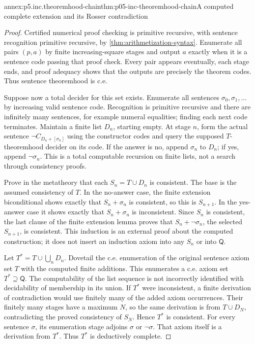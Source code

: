 \begin{annexitem}{annex:p5.inc.theoremhood-chain}{thm:p05-inc-theoremhood-chain}{A computed complete extension and its Rosser contradiction}
\begin{proof}
Certified numerical proof checking is primitive recursive, with
sentence recognition primitive recursive, by
\cref{thm:arithmetization-syntax}. Enumerate all pairs \((p,a)\)
by finite increasing-square stages and output \(a\) exactly when
it is a sentence code passing that proof check. Every pair appears
eventually, each stage ends, and proof adequacy shows that the outputs
are precisely the theorem codes. Thus sentence theoremhood is c.e.

Suppose now a total decider for this set exists. Enumerate all
sentences \(\sigma_0,\sigma_1,\ldots\) by increasing valid sentence
code. Recognition is primitive recursive and there are infinitely
many sentences, for example numeral equalities; finding each next
code terminates. Maintain a finite list \(D_n\), starting empty.
At stage \(n\), form the actual sentence
\(\neg C_{D_n\mathbin{+}[\sigma_n]}\) using the constructor
codes and query the supposed \(T\)-theoremhood decider on its code.
If the answer is no, append \(\sigma_n\) to \(D_n\); if yes,
append \(\neg\sigma_n\). This is a total computable recursion
on finite lists, not a search through consistency proofs.

Prove in the metatheory that each \(S_n=T\cup D_n\) is consistent.
The base is the assumed consistency of \(T\). In the no-answer
case, the finite extension biconditional shows exactly that
\(S_n+\sigma_n\) is consistent, so this is \(S_{n+1}\).
In the yes-answer case it shows exactly that
\(S_n+\sigma_n\) is inconsistent. Since \(S_n\) is consistent,
the last clause of the finite extension lemma proves that
\(S_n+\neg\sigma_n\), the selected \(S_{n+1}\), is consistent.
This induction is an external proof about the computed construction;
it does not insert an induction axiom into any \(S_n\) or into
\(\mathsf Q\).

Let \(T^*=T\cup\bigcup_nD_n\). Dovetail the c.e. enumeration of
the original sentence axiom set \(T\) with the computed finite
additions. This enumerates a c.e. axiom set \(T^*\supseteq\mathsf Q\).
The computability of the list sequence is not incorrectly identified
with decidability of membership in its union. If \(T^*\) were
inconsistent, a finite derivation of contradiction would use finitely
many of the added axiom occurrences. Their finitely many stages have
a maximum \(N\), so the same derivation is from \(T\cup D_N\),
contradicting the proved consistency of \(S_N\). Hence \(T^*\)
is consistent. For every sentence \(\sigma\), its enumeration
stage adjoins \(\sigma\) or \(\neg\sigma\). That axiom itself
is a derivation from \(T^*\). Thus \(T^*\) is deductively complete.


\end{proof}
\end{annexitem}
